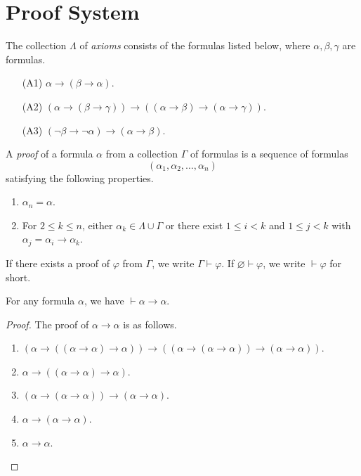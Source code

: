 \section{Proof System}
\begin{definition}
  The collection $\Lambda$ of \emph{axioms} consists of the formulas listed
  below, where $\alpha, \beta, \gamma$ are formulas.
  \begin{enumerate}[leftmargin=3.5em]
    \item[(A1)] $\alpha \to (\beta \to \alpha)$.
    \item[(A2)] $(\alpha \to (\beta \to \gamma)) \to
    ((\alpha \to \beta) \to (\alpha \to \gamma))$.
    \item[(A3)] $(\neg \beta \to \neg \alpha) \to (\alpha \to \beta)$.
  \end{enumerate}
\end{definition}

\begin{definition}
  A \emph{proof} of a formula $\alpha$ from a collection $\Gamma$ of formulas
  is a sequence of formulas
  \begin{equation*}
    (\alpha_1, \alpha_2, \dots, \alpha_n)
  \end{equation*}
  satisfying the following properties.
  \begin{enumerate}
    \item $\alpha_n = \alpha$.
    \item For $2 \leq k \leq n$, either
    $\alpha_k \in \Lambda \cup \Gamma$ or there exist
    $1 \leq i < k$ and $1 \leq j < k$ with $\alpha_j = \alpha_i \to \alpha_k$.
  \end{enumerate}
  If there exists a proof of $\varphi$ from $\Gamma$, we write
  $\Gamma \vdash \varphi$.
  If $\varnothing \vdash \varphi$, we write $\vdash \varphi$ for short.
\end{definition}

\begin{theorem}
  \label{thm:identity}
  For any formula $\alpha$, we have $\vdash \alpha \to \alpha$.
\end{theorem}
\begin{proof}
  The proof of $\alpha \to \alpha$ is as follows.
  \begin{enumerate}[1.]
    \item $(\alpha \to ((\alpha \to \alpha) \to \alpha)) \to
    ((\alpha \to (\alpha \to \alpha)) \to (\alpha \to \alpha))$.
    \item $\alpha \to ((\alpha \to \alpha) \to \alpha)$.
    \item $(\alpha \to (\alpha \to \alpha)) \to (\alpha \to \alpha)$.
    \item $\alpha \to (\alpha \to \alpha)$.
    \item $\alpha \to \alpha$.
    \qedhere
  \end{enumerate}
\end{proof}

